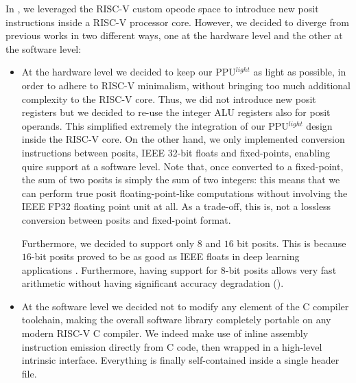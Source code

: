 In \cite{ppulight}, we leveraged the RISC-V custom opcode space to introduce new posit instructions inside a RISC-V processor core.
However, we decided to diverge from previous works in two different ways, one at the hardware level and the other at the software level:
\begin{itemize}
    \item At the hardware level we decided to keep our PPU$^{light}$ as light as possible, in order to adhere to RISC-V minimalism, without bringing too much additional complexity to the RISC-V core. Thus, we did not introduce new posit registers but we decided to re-use the integer ALU registers also for posit operands. This simplified extremely the integration of our PPU$^{light}$ design inside the RISC-V core. On the other hand, we only implemented conversion instructions between posits, IEEE 32-bit floats  and fixed-points, enabling quire support at a software level. Note that, once converted to a fixed-point, the sum of two posits is simply the sum of two integers: this means that we can perform true posit floating-point-like computations without involving the IEEE FP32 floating point unit at all. As a trade-off, this is, not a lossless conversion between posits and fixed-point format.
    
    Furthermore, we decided to support only $8$ and $16$ bit posits. This is because $16$-bit posits proved to be as good as IEEE floats in deep learning applications \cite{deeppositron,positnn,9066876}. Furthermore, having support for $8$-bit posits allows very fast arithmetic without having significant accuracy degradation (\cite{coco_et_al_ieeespm_2020,coco2020sensors}).
    \item At the software level we decided not to modify any element of the C compiler toolchain, making the overall software library completely portable on any modern RISC-V C compiler. We indeed make use of inline assembly instruction emission directly from C code, then wrapped in a high-level intrinsic interface. Everything is finally self-contained inside a single header file.
\end{itemize}


